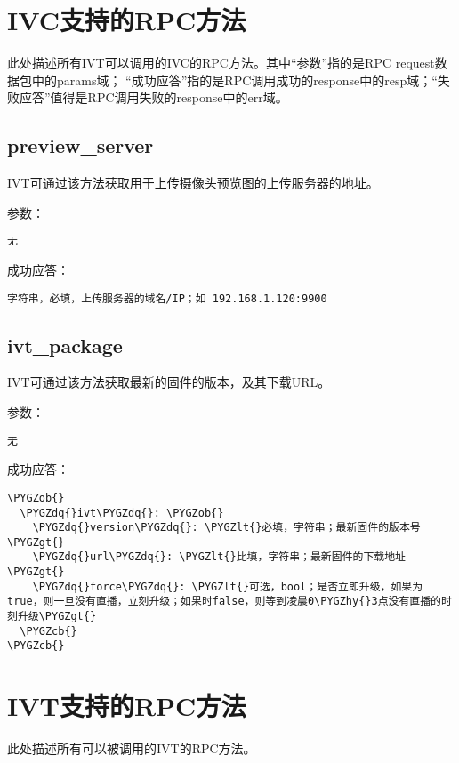 \documentclass[letterpaper,10pt,english]{sphinxmanual}
\def\PYGZob{\char`\{}
\def\PYGZcb{\char`\}}
\def\PYGZlt{\char`\<}
\def\PYGZgt{\char`\>}
\def\PYGZhy{\char`\-}
\def\PYGZdq{\char`\"}
\begin{document}
\section{IVC支持的RPC方法}
\label{rpc:ivcrpc}
此处描述所有IVT可以调用的IVC的RPC方法。其中“参数”指的是RPC request数据包中的params域；
“成功应答”指的是RPC调用成功的response中的resp域；“失败应答”值得是RPC调用失败的response中的err域。


\subsection{preview\_server}
\label{rpc:preview-server}
IVT可通过该方法获取用于上传摄像头预览图的上传服务器的地址。

参数：

\begin{Verbatim}[commandchars=\\\{\}]
无
\end{Verbatim}

成功应答：

\begin{Verbatim}[commandchars=\\\{\}]
字符串，必填，上传服务器的域名/IP；如 192.168.1.120:9900
\end{Verbatim}


\subsection{ivt\_package}
\label{rpc:ivt-package}
IVT可通过该方法获取最新的固件的版本，及其下载URL。

参数：

\begin{Verbatim}[commandchars=\\\{\}]
无
\end{Verbatim}

成功应答：

\begin{Verbatim}[commandchars=\\\{\}]
\PYGZob{}
  \PYGZdq{}ivt\PYGZdq{}: \PYGZob{}
    \PYGZdq{}version\PYGZdq{}: \PYGZlt{}必填，字符串；最新固件的版本号\PYGZgt{}
    \PYGZdq{}url\PYGZdq{}: \PYGZlt{}比填，字符串；最新固件的下载地址\PYGZgt{}
    \PYGZdq{}force\PYGZdq{}: \PYGZlt{}可选，bool；是否立即升级，如果为true，则一旦没有直播，立刻升级；如果时false，则等到凌晨0\PYGZhy{}3点没有直播的时刻升级\PYGZgt{}
  \PYGZcb{}
\PYGZcb{}
\end{Verbatim}


\section{IVT支持的RPC方法}
\label{rpc:ivtrpc}
此处描述所有可以被调用的IVT的RPC方法。
\end{document}
